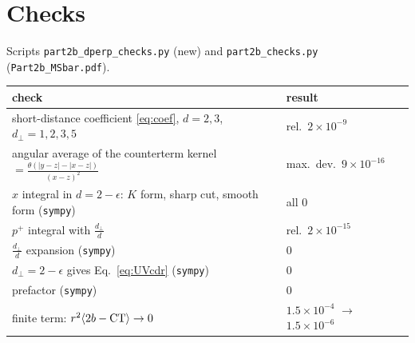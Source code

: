 \documentclass[10pt]{article}
\numberwithin{equation}{section}
\begin{document}
\section{Checks}
Scripts \texttt{part2b\_dperp\_checks.py} (new) and \texttt{part2b\_checks.py} (\texttt{Part2b\_MSbar.pdf}).
\begin{center}\small
\begin{tabular}{@{}p{}p{}@{}}\toprule
check & result\\\midrule
short-distance coefficient \eqref{eq:coef}, $d=2,3$, $d_\perp=1,2,3,5$ & rel.\ $2\times10^{-9}$\\
angular average of the counterterm kernel $=\frac{\theta(|y-z|-|x-z|)}{(x-z)^2}$ & max.\ dev.\ $9\times10^{-16}$\\
$x$ integral in $d=2-\epsilon$: $K$ form, sharp cut, smooth form (\texttt{sympy}) & all 0\\
$p^+$ integral with $\frac{d_\perp}{d}$ & rel.\ $2\times10^{-15}$\\
$\frac{d_\perp}{d}$ expansion (\texttt{sympy}) & $0$\\
$d_\perp=2-\epsilon$ gives Eq.~\eqref{eq:UVcdr} (\texttt{sympy}) & $0$\\
prefactor (\texttt{sympy}) & $0$\\
finite term: $r^2\langle2b-{\rm CT}\rangle\to0$ & $1.5\times10^{-4}$ $\to$ $1.5\times10^{-6}$\\\bottomrule
\end{tabular}
\end{center}
\end{document}
